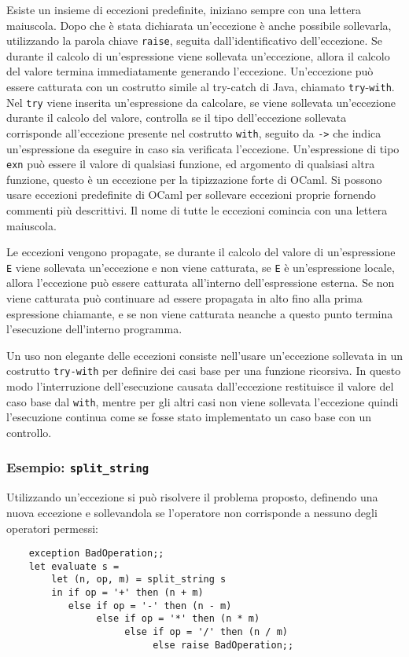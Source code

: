\documentclass{article}
\numberwithin{equation}{subsection}
\begin{document}
Esiste un insieme di eccezioni predefinite, iniziano sempre con una lettera maiuscola. Dopo che è stata dichiarata un'eccezione è anche possibile sollevarla, utilizzando la parola chiave \verb|raise|, seguita dall'identificativo dell'eccezione. 
Se durante il calcolo di un'espressione viene sollevata un'eccezione, allora il calcolo del valore termina immediatamente generando l'eccezione. Un'eccezione può essere catturata con un costrutto simile al try-catch di Java, chiamato \verb|try|-\verb|with|. Nel \verb|try| viene inserita un'espressione da calcolare, se viene sollevata un'eccezione durante il calcolo del valore, controlla se il tipo dell'eccezione sollevata corrisponde all'eccezione presente nel costrutto \verb|with|, seguito da \verb|->| che indica un'espressione da eseguire in caso sia verificata l'eccezione. Un'espressione di tipo \verb|exn| può essere il valore di qualsiasi funzione, ed argomento di qualsiasi altra funzione, questo è un eccezione per la tipizzazione forte di OCaml. Si possono usare eccezioni predefinite di OCaml per sollevare eccezioni proprie fornendo commenti più descrittivi. Il nome di tutte le eccezioni comincia con una lettera maiuscola. 

Le eccezioni vengono propagate, se durante il calcolo del valore di un'espressione \verb|E| viene sollevata un'eccezione e non viene catturata, se \verb|E| è un'espressione locale, allora l'eccezione può essere catturata all'interno dell'espressione esterna. Se non viene catturata può continuare ad essere propagata in alto fino alla prima espressione chiamante, e se non viene catturata neanche a questo punto termina l'esecuzione dell'interno programma. 

Un uso non elegante delle eccezioni consiste nell'usare un'eccezione sollevata in un costrutto \verb|try-with| per definire dei casi base per una funzione ricorsiva. In questo modo l'interruzione dell'esecuzione causata dall'eccezione restituisce il valore del caso base dal \verb|with|, mentre per gli altri casi non viene sollevata l'eccezione quindi l'esecuzione continua come se fosse stato implementato un caso base con un controllo. 

\subsubsection*{Esempio: \texttt{split\_string}}

Utilizzando un'eccezione si può risolvere il problema proposto, definendo una nuova eccezione e sollevandola se l'operatore non corrisponde a nessuno degli operatori permessi:
\begin{verbatim}
    exception BadOperation;;
    let evaluate s =
        let (n, op, m) = split_string s
        in if op = '+' then (n + m)
           else if op = '-' then (n - m)
                else if op = '*' then (n * m)
                     else if op = '/' then (n / m)
                          else raise BadOperation;;
\end{verbatim}
\end{document}
